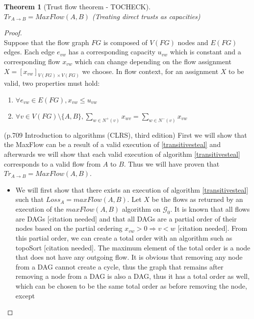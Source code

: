 \documentclass[11pt]{article}
\newtheorem{theorem}{Theorem}[section]
\theoremstyle{definition}
\theoremstyle{corollary}
\theoremstyle{lemma}
\begin{document}
    \begin{theorem}[Trust flow theorem - TOCHECK] \ \\
    \label{trustflow}
       $Tr_{A \rightarrow B} = MaxFlow(A, B)$ (Treating direct trusts as capacities)
    \end{theorem}
    \begin{proof} \ \\
       Suppose that the flow graph $FG$ is composed of $V(FG)$ nodes and $E(FG)$ edges. Each edge $e_{vw}$ has a
       corresponding capacity $u_{vw}$ which is constant and a corresponding flow $x_{vw}$ which can change depending on the
       flow assignment $X = [x_{vw}]_{V(FG) \times V(FG)}$ we choose. In flow context, for an assignment $X$ to be valid, two
       properties must hold:
       \begin{enumerate}
          \item $\forall e_{vw} \in E(FG), x_{vw} \leq u_{vw}$
          \item $\forall v \in V(FG) \setminus \{A,B\}, \sum\limits_{w \in N^{+}(v)}x_{wv} =
                \sum\limits_{w \in N^{-}(v)}x_{vw}$
       \end{enumerate} (p.709 Introduction to algorithms (CLRS), third edition)
       First we will show that the MaxFlow can be a result of a valid execution of \ref{transitivesteal} and afterwards we
       will show that each valid execution of algorithm \ref{transitivesteal} corresponds to a valid flow from $A$ to $B$.
       Thus we will have proven that $Tr_{A \rightarrow B} = MaxFlow(A, B)$.
       \begin{itemize}
          \item We will first show that there exists an execution of algorithm \ref{transitivesteal} such that $Loss_A =
          maxFlow(A, B)$. Let $X$ be the flows as returned by an execution of the $maxFlow(A, B)$
          algorithm on $\mathcal{G}_0$. It is known that all flows are DAGs [citation needed] and that all DAGs are a partial
          order of their nodes based on the partial ordering $x_{vw} > 0 \Rightarrow v < w$ [citation needed]. From this
          partial order, we can create a total order with an algorithm such as topoSort [citation needed]. The maximum
          element of the total order is a node that does not have any outgoing flow. It is obvious that removing any node
          from a DAG cannot create a cycle, thus the graph that remains after removing a node from a DAG is also a DAG, thus
          it has a total order as well, which can be chosen to be the same total order as before removing the node, except

\end{itemize}
\end{proof}
\end{document}
